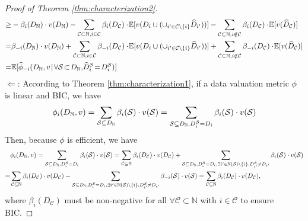 \begin{proof}[Proof of Theorem \ref{thm:characterization2}]
\begin{align*}
		\geq & -\beta_i(\granddataset) \cdot v(\granddataset) -\sum_{\mathcal{C}\subset \mathbb{N}, i\in \mathcal{C}} \beta_i(D_{\mathcal{C}}) \cdot\! \mathbb{E}[v(D_i \cup (\cup_{i'\in \mathcal{C} \setminus \{i\}} \widehat{D}_{i'}))] -\sum_{\mathcal{C}\subset \mathbb{N}, i\notin \mathcal{C}} \beta_i(D_{\mathcal{C}}) \cdot\! \mathbb{E}[v(\widehat{D}_{\mathcal{C}})]\\
		= & \beta_{-i}(\granddataset) \cdot v(\granddataset) +\sum_{\mathcal{C}\subset \mathbb{N}, i\in \mathcal{C}} \beta_{-i}(D_{\mathcal{C}}) \cdot\! \mathbb{E}[v(D_i \cup (\cup_{i'\in \mathcal{C} \setminus \{i\}} \widehat{D}_{i'}))] +\sum_{\mathcal{C}\subset \mathbb{N}, i\notin \mathcal{C}} \beta_{-i}(D_{\mathcal{C}}) \cdot\! \mathbb{E}[v(\widehat{D}_{\mathcal{C}})]\\
		= & \mathbb{E}[\empiricaldatavalue_{-i}(\granddataset, v \!\mid\! \forall \datasubset \!\subset \!\granddataset,\! \reportedstoi\! =  \!\stoi)]
	\end{align*}
	$\Leftarrow$: According to Theorem \ref{thm:characterization1}, if a data valuation metric $\phi$ is linear and BIC, we have
	\begin{align*}
		\phi_i(D_{\mathbb{N}}, v) = \sum_{\mathcal{S} \subseteq D_{\mathbb{N}}} \beta_i(\mathcal{S}) \cdot v(\mathcal{S}) = \sum_{\mathcal{S} \subseteq D_{\mathbb{N}}, D^{\mathcal{S}}_{i} = D_i} \beta_i(\mathcal{S}) \cdot v(\mathcal{S})
	\end{align*}
	Then, because $\phi$ is efficient, we have 
	\begin{align*}
		&\phi_i(D_{\mathbb{N}}, v) = \sum_{\mathcal{S} \subseteq D_{\mathbb{N}}, D^{\mathcal{S}}_{i} = D_i} \beta_i(\mathcal{S}) \cdot v(\mathcal{S}) = \sum_{\mathcal{C} \subseteq \mathbb{N}} \beta_i(D_{\mathcal{C}}) \cdot v(D_{\mathcal{C}}) + \sum_{\mathcal{S} \subseteq D_{\mathbb{N}}, D^{\mathcal{S}}_{i} = D_i, \exists i' \in \mathbb{N}(\mathcal{S})\setminus \{i\}, D^{\mathcal{S}}_{i'} \neq D_{i'}} \beta_i(\mathcal{S}) \cdot v(\mathcal{S}) \\
		= &\sum_{\mathcal{C} \subseteq \mathbb{N}} \beta_i(D_{\mathcal{C}}) \cdot v(D_{\mathcal{C}}) - \sum_{\mathcal{S} \subseteq D_{\mathbb{N}}, D^{\mathcal{S}}_{i} = D_i, \exists i' \in \mathbb{N}(\mathcal{S})\setminus \{i\}, D^{\mathcal{S}}_{i'} \neq D_{i'}} \beta_{-i}(\mathcal{S}) \cdot v(\mathcal{S}) = \sum_{\mathcal{C} \subseteq \mathbb{N}} \beta_i(D_{\mathcal{C}}) \cdot v(D_{\mathcal{C}}),
	\end{align*}
	where $\beta_i(D_{\mathcal{C}})$ must be non-negative for all $\forall \mathcal{C} \subset \mathbb{N}$ with $i\in \mathcal{C}$ to ensure BIC.
\end{proof}

